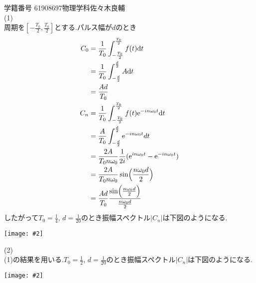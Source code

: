 \documentclass[uplatex,a4j,11pt]{jsarticle}
\makeatletter
\def\fgcaption{\def\@captype{figure}\caption}
\newcommand{\mfig}[3][width=15cm]{
\begin{center}
\texttt{[image: \#2]}
\fgcaption{#3 \label{fig:#2}}
\end{center}
}
\makeatother
\begin{document}
学籍番号 61908697\qquad 物理学科\qquad 佐々木良輔\\
(1)\\
周期を$[-\frac{T_0}{2},\frac{T_0}{2}]$とする.パルス幅が$d$のとき
\begin{align}
  C_0&=\frac{1}{T_0}\int^{\frac{T_0}{2}}_{-\frac{T_0}{2}}f(t){\rm d}t\nonumber\\
  &=\frac{1}{T_0}\int^{\frac{d}{2}}_{-\frac{d}{2}}A{\rm d}t\nonumber\\
  &=\frac{Ad}{T_0}\\
  C_n&=\frac{1}{T_0}\int^{\frac{T_0}{2}}_{-\frac{T_0}{2}}f(t){\rm e}^{-in\omega_0t}{\rm d}t\nonumber\\
  &=\frac{A}{T_0}\int^{\frac{d}{2}}_{-\frac{d}{2}}{\rm e}^{-in\omega_0t}dt\nonumber\\
  &=\frac{2A}{T_0n\omega_0}\frac{1}{2i}({\rm e}^{in\omega_0t}-{\rm e}^{-in\omega_0t})\nonumber\\
  &=\frac{2A}{T_0n\omega_0}\sin\Bigl(\frac{n\omega_0d}{2}\Bigr)\nonumber\\
  &=\frac{Ad}{T_0}\frac{\sin\Bigl(\frac{n\omega_0d}{2}\Bigr)}{\frac{n\omega_0d}{2}}
\end{align}
したがって$T_0=\frac{1}{4}$, $d=\frac{1}{20}$のとき振幅スペクトル$|C_n|$は下図のようになる.
\mfig[width=10cm]{fig1.eps}{振幅スペクトル}
\newpage
(2)\\
(1)の結果を用いる.$T_0=\frac{1}{2}$, $d=\frac{1}{20}$のとき振幅スペクトル$|C_n|$は下図のようになる.
\mfig[width=10cm]{fig2.eps}{振幅スペクトル}
\end{document}
